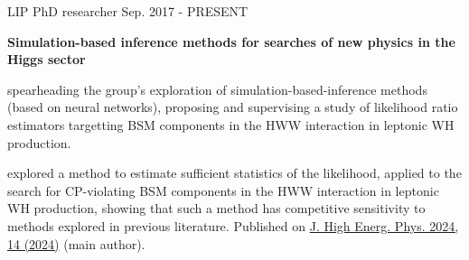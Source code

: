 
\begin{cventries}

    \cventry
    {LIP}
    {PhD researcher}
    {}
    {Sep. 2017 - PRESENT}
    {
        \textbf{Simulation-based inference methods for searches of new physics in the Higgs sector}\vspace{12pt}
        \begin{cvitems}      
            \item {spearheading the group's exploration of simulation-based-inference methods (based on neural networks), proposing and supervising a study of likelihood ratio estimators targetting BSM components in the HWW interaction in leptonic WH production.}
            \item {explored a method to estimate sufficient statistics of the likelihood, applied to the search for CP-violating BSM components in the HWW interaction in leptonic WH production, showing that such a method has competitive sensitivity to methods explored in previous literature. Published on \href{https://doi.org/10.1007/JHEP04(2024)014}{J. High Energ. Phys. 2024, 14 (2024)} (main author).}
        \end{cvitems}
    }


\end{cventries}
